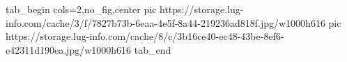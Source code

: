  
 
 
 
 

\ifcmt
  tab_begin cols=2,no_fig,center
     pic https://storage.lug-info.com/cache/3/f/7827b73b-6eaa-4e5f-8a44-219236ad818f.jpg/w1000h616%
		 pic https://storage.lug-info.com/cache/8/c/3b16ce40-ec48-43be-8ef6-e42311d190ea.jpg/w1000h616%
  tab_end
\fi
